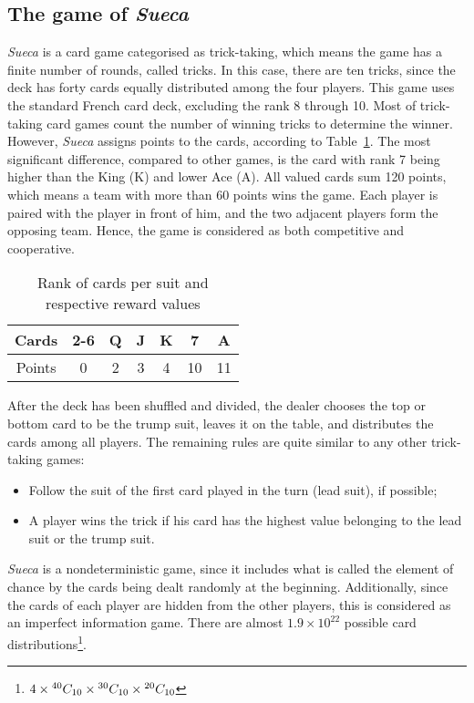 \subsection{The game of \emph{Sueca}}

\emph{Sueca} is a card game categorised as trick-taking, which means the game has a finite number of rounds, called tricks.
In this case, there are ten tricks, since the deck has forty cards equally distributed among the four players.
This game uses the standard French card deck, excluding the rank 8 through 10.
Most of trick-taking card games count the number of winning tricks to determine the winner.
However, \emph{Sueca} assigns points to the cards, according to Table~\ref{tab:points-table}.
The most significant difference, compared to other games, is the card with rank 7 being higher than the King (K) and lower Ace (A).
All valued cards sum 120 points, which means a team with more than 60 points wins the game.
Each player is paired with the player in front of him, and the two adjacent players form the opposing team.
Hence, the game is considered as both competitive and cooperative.

\begin{table}[ht]
\centering
\label{tab:points-table}
\caption{Rank of cards per suit and respective reward values}
\begin{tabular}{|c|c|c|c|c|c|c|}
\hline
Cards  & 2-6 & Q & J & K & 7  & A  \\ \hline
Points & 0   & 2 & 3 & 4 & 10 & 11 \\ \hline
\end{tabular}
\end{table}

After the deck has been shuffled and divided, the dealer chooses the top or bottom card to be the trump suit, leaves it on the table, and distributes the cards among all players.
The remaining rules are quite similar to any other trick-taking games:
\begin{itemize}
\item Follow the suit of the first card played in the turn (lead suit), if possible;
\item A player wins the trick if his card has the highest value belonging to the lead suit or the trump suit.
\end{itemize}


\emph{Sueca} is a nondeterministic game, since it includes what is called the element of chance by the cards being dealt randomly at the beginning.
Additionally, since the cards of each player are hidden from the other players, this is considered as an imperfect information game.
There are almost $1.9\times10^{22}$ possible card distributions\footnote{$4\times{}^{40}C_{10}\times{}^{30}C_{10}\times{}^{20}C_{10}$}.
